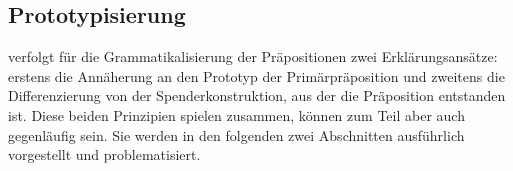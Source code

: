 \subsection{Prototypisierung}
\label{sec:Prototypisierung}
\citet[132]{DiMeola2000} verfolgt für die Grammatikalisierung der Präpositionen zwei Erklärungsansätze: erstens die Annäherung an den Prototyp der Primärpräposition und zweitens die Differenzierung von der Spenderkonstruktion, aus der die Präposition entstanden ist. 
Diese beiden Prinzipien spielen zusammen, können zum Teil aber auch gegenläufig sein. 
Sie werden in den folgenden zwei Abschnitten ausführlich vorgestellt und problematisiert. 

